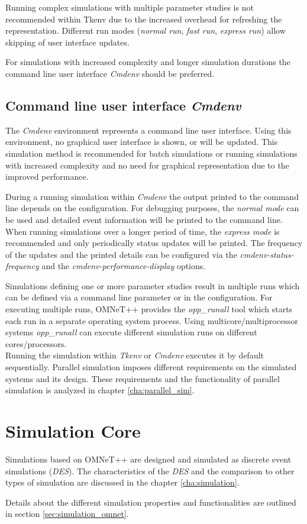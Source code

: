 Running complex simulations with multiple parameter studies is not recommended within Tkenv due to the increased overhead for refreshing the representation.
Different run modes (\emph{normal run}, \emph{fast run}, \emph{express run}) allow skipping of user interface updates. \cite[section 7.3.2]{omnet_user_guide}

For simulations with increased complexity and longer simulation durations the command line user interface \emph{Cmdenv} should be preferred.

\subsection{Command line user interface \emph{Cmdenv}}
\label{sec:omnet_running_cmdenv}
The \emph{Cmdenv} environment represents a command line user interface.
Using this environment, no graphical user interface is shown, or will be updated.
This simulation method is recommended for batch simulations or running simulations with increased complexity and no need for graphical representation due to the improved performance.

\begin{sloppypar}
During a running simulation within \emph{Cmdenv} the output printed to the command line depends on the configuration.
For debugging purposes, the \emph{normal mode} can be used and detailed event information will be printed to the command line.
When running simulations over a longer period of time, the \emph{express mode} is recommended and only periodically status updates will be printed.
The frequency of the updates and the printed details can be configured via the \emph{cmdenv-status-frequency} and the \mbox{\emph{cmdenv-performance-display}} options. \cite[section 10.2.3]{omnet_manual}
\end{sloppypar}

Simulations defining one or more parameter studies result in multiple runs which can be defined via a command line parameter or in the configuration.
For executing multiple runs, OMNeT++ provides the \emph{opp\_runall} tool which starts each run in a separate operating system process.
Using multicore/multiprocessor systems \emph{opp\_runall} can execute different simulation runs on different cores/processors. \cite[section 10.4.3]{omnet_manual}
\\

Running the simulation within \emph{Tkenv} or \emph{Cmdenv} executes it by default sequentially.
Parallel simulation imposes different requirements on the simulated systems and its design.
These requirements and the functionality of parallel simulation is analyzed in chapter \ref{cha:parallel_sim}.

\section{Simulation Core}
Simulations based on OMNeT++ are designed and simulated as discrete event simulations (\emph{DES}).
The characteristics of the \emph{DES} and the comparison to other types of simulation are discussed in the chapter \ref{cha:simulation}.

Details about the different simulation properties and functionalities are outlined in section \ref{sec:simulation_omnet}.